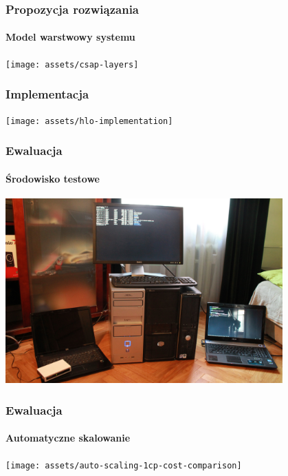 \documentclass{beamer}
\begin{document}
\begin{frame}
\frametitle{Propozycja rozwiązania}
\framesubtitle{Model warstwowy systemu}
\vspace{2 mm}
\begin{center}
\texttt{[image: assets/csap-layers]}
\end{center}
\end{frame}



\begin{frame}
\frametitle{Implementacja}

\vspace{2 mm}
\begin{center}
\texttt{[image: assets/hlo-implementation]}
\end{center}
\end{frame}



\begin{frame}
\frametitle{Ewaluacja}
\framesubtitle{Środowisko testowe}

\begin{center}

\includegraphics[width=0.8\textwidth]{assets/testbed}
\end{center}

\end{frame}




\begin{frame}
\frametitle{Ewaluacja}
\framesubtitle{Automatyczne skalowanie}

\begin{center}
\texttt{[image: assets/auto-scaling-1cp-cost-comparison]}
\end{center}


\end{frame}
\end{document}
